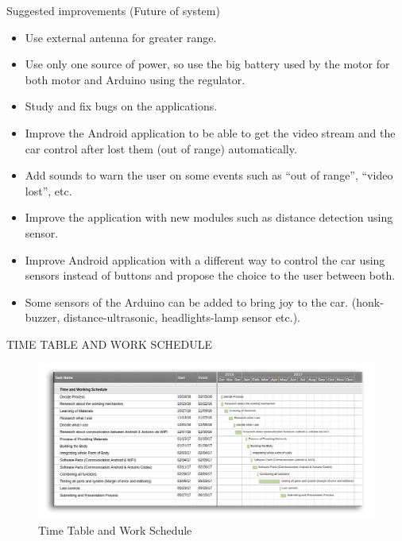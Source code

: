 \documentclass[xcolor=table, 9pt]{beamer}
\begin{document}
\begin{frame}{Suggested improvements (Future of system)}
\begin{itemize}
\item Use external antenna for greater range.
\vspace{0.1cm}
\item Use only one source of power, so use the big battery used by the motor for both motor and Arduino
using the regulator.
\vspace{0.1cm}
\item Study and fix bugs on the applications.
\vspace{0.1cm}
\item Improve the Android application to be able to get the video stream and the car control after lost them (out of range) automatically.
\vspace{0.1cm}
\item Add sounds to warn the user on some events such as “out of range”, “video lost”, etc.
\vspace{0.1cm}
\item Improve the application with new modules such as distance detection using sensor.
\vspace{0.1cm}
\item Improve Android application with a different way to control the car using sensors instead of buttons and propose the choice to the user between both.
\vspace{0.1cm}
\item Some sensors of the Arduino can be added to bring joy to the car. (honk-buzzer, distance-ultrasonic, headlights-lamp sensor etc.).
\end{itemize}

\end{frame}




\begin{frame}{TIME TABLE AND WORK SCHEDULE}
\begin{figure}
\includegraphics[width=1\linewidth]{ganttChart.png}
\caption{Time Table and Work Schedule}
\end{figure}
\end{frame}
\end{document}
